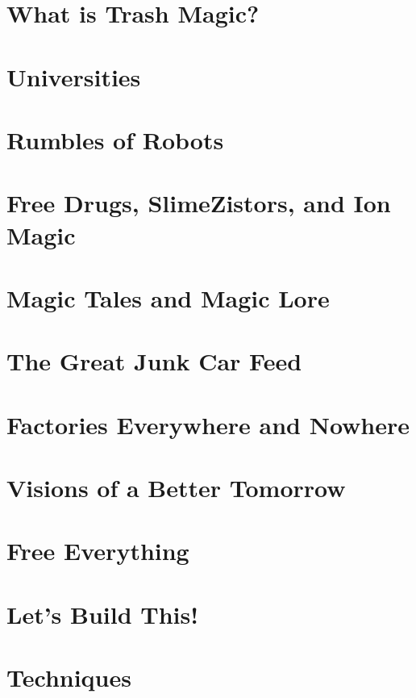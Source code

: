 \documentclass[ebook,12pt,openany]{memoir} %
\begin{document}
\chapter{What is Trash Magic?}


\chapter{Universities}


\chapter{Rumbles of Robots}


\chapter{Free Drugs, SlimeZistors, and Ion Magic}


\chapter{Magic Tales and Magic Lore}


\chapter{The Great Junk Car Feed}


\chapter{Factories Everywhere and Nowhere}


\chapter{Visions of a Better Tomorrow}


\chapter{Free Everything}


\chapter{Let's Build This!}


\chapter{Techniques}

\end{document}
